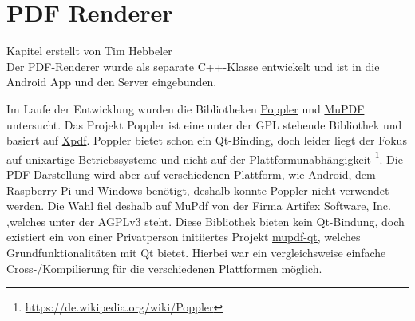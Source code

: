 \chapter{PDF Renderer}
\thispagestyle{fancy}

Kapitel erstellt von Tim Hebbeler
\\
Der PDF-Renderer wurde als separate C++-Klasse entwickelt und ist in die Android App und den Server eingebunden.

Im Laufe der Entwicklung wurden die Bibliotheken \href{https://poppler.freedesktop.org/}{Poppler} und \href{http://mupdf.com/}{MuPDF} untersucht. Das Projekt Poppler ist eine unter der GPL stehende Bibliothek und basiert auf \href{https://de.wikipedia.org/wiki/Xpdf}{Xpdf}. Poppler bietet schon ein Qt-Binding, doch leider liegt der Fokus auf unixartige Betriebssysteme und nicht auf der Plattformunabhängigkeit \footnote{\url{https://de.wikipedia.org/wiki/Poppler}}. Die PDF Darstellung wird aber auf verschiedenen Plattform, wie Android, dem Raspberry Pi und Windows benötigt, deshalb konnte Poppler nicht verwendet werden.
Die Wahl fiel deshalb auf MuPdf von der Firma Artifex Software, Inc. ,welches unter der AGPLv3 steht. Diese Bibliothek bieten kein Qt-Bindung, doch existiert ein von einer Privatperson initiiertes Projekt \href{https://github.com/xiangxw/mupdf-qt}{mupdf-qt}, welches Grundfunktionalitäten mit Qt bietet. Hierbei war ein vergleichsweise einfache Cross-/Kompilierung für die verschiedenen Plattformen möglich.

